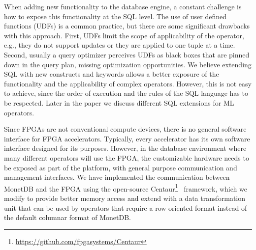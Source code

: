 \documentclass[11pt,dvipdfm]{article}
\begin{document}

When adding new functionality to the database engine, a constant challenge is how to expose this functionality at the SQL level. The use of user defined functions (UDFs) is a common practice, but there are some significant drawbacks with this approach. First, UDFs limit the scope of applicability of the operator, e.g., they do not support updates or they are applied to one tuple at a time. Second, usually a query optimizer perceives UDFs as black boxes that are pinned down in the query plan, missing optimization opportunities. We believe extending SQL with new constructs and keywords allows a better exposure of the functionality and the applicability of complex operators. However, this is not easy to achieve, since the order of execution and the rules of the SQL language has to be respected. Later in the paper we discuss different SQL extensions for ML operators.


Since FPGAs are not conventional compute devices, there is no general software interface for FPGA accelerators. Typically, every accelerator has its own software interface designed for its purposes. However, in the database environment where many different operators will use the FPGA, the customizable hardware needs to be exposed as part of the platform, with general purpose communication and management interfaces. We have implemented the communication between MonetDB and the FPGA using the open-source Centaur\footnote{\url{https://github.com/fpgasystems/Centaur}}~\cite{owaida-fccm2017} framework, which we modify to provide better memory access and extend with a data transformation unit that can be used by operators that require a row-oriented format instead of the default columnar format of MonetDB. 
\end{document}
